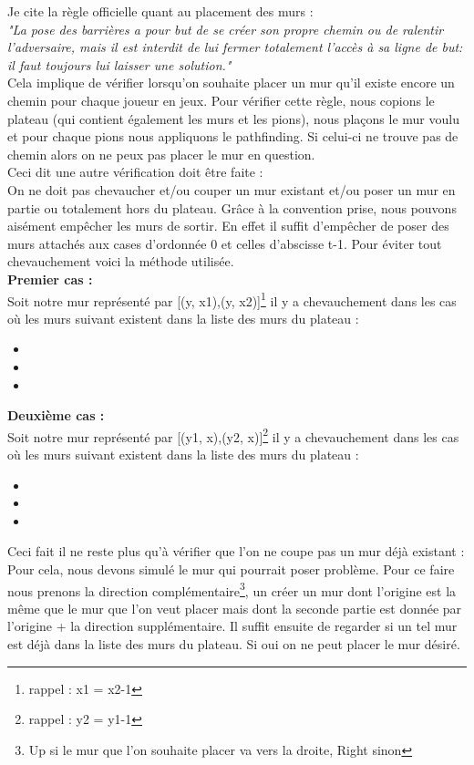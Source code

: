 \documentclass[a4paper, 12pt]{article}
\begin{document}
Je cite la règle officielle quant au placement des murs : \\
\textit{"La pose des barrières a pour but de se créer son propre chemin ou de ralentir l’adversaire, mais il est interdit de lui fermer totalement l’accès à sa ligne de but: il faut toujours lui laisser une solution."} \\

Cela implique de vérifier lorsqu'on souhaite placer un mur qu'il existe encore un chemin pour chaque joueur en jeux. Pour vérifier cette règle, nous copions le plateau (qui contient également les murs et les pions), nous plaçons le mur voulu et pour chaque pions nous appliquons le pathfinding. Si celui-ci ne trouve pas de chemin alors on ne peux pas placer le mur en question.\\
Ceci dit une autre vérification doit être faite : \\

On ne doit pas chevaucher et/ou couper un mur existant et/ou poser un mur en partie ou totalement hors du plateau.
Grâce à la convention prise, nous pouvons aisément empêcher les murs de sortir. En effet il suffit d'empêcher de poser des murs attachés aux cases d'ordonnée 0 et celles d'abscisse t-1. Pour éviter tout chevauchement voici la méthode utilisée.\\
\textbf{Premier cas :} \\

 Soit notre mur représenté par [(y, x1),(y, x2)]\footnote{rappel : x1 = x2-1} il y a chevauchement dans les cas où les murs suivant existent dans la liste des murs du plateau :
\begin{itemize}
\item[•] [(y, x1),(y, x2)]
\item[•] [(y, x1-1),(y, x1)]
\item[•] [(y, x2),(y, x2+1)]
\end{itemize}
\textbf{Deuxième cas :} \\
 Soit notre mur représenté par [(y1, x),(y2, x)]\footnote{rappel : y2 = y1-1} il y a chevauchement dans les cas où les murs suivant existent dans la liste des murs du plateau :
\begin{itemize}
\item[•] [(y1, x),(y2, x)]
\item[•] [(y1+1, x),(y1, x)]
\item[•] [(y2, x),(y2-1, x)]
\end{itemize}
Ceci fait il ne reste plus qu'à vérifier que l'on ne coupe pas un mur déjà existant : \\
Pour cela, nous devons simulé le mur qui pourrait poser problème. Pour ce faire nous prenons la direction complémentaire\footnote{Up si le mur que l'on souhaite placer va vers la droite, Right sinon}, un créer un mur dont l'origine est la même que le mur que l'on veut placer mais dont la seconde partie est donnée par l'origine + la direction supplémentaire. Il suffit ensuite de regarder si un tel mur est déjà dans la liste des murs du plateau. Si oui on ne peut placer le mur désiré. \\
\end{document}

